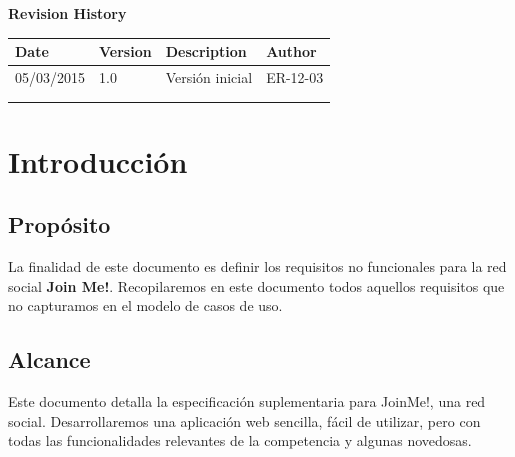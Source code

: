\documentclass[12pt, a4paper, titlepage]{article}
\begin{document}
\begin{titlepage}
\vspace{2cm}
\begin{center}
	\large{\textbf{Revision History}}
	
    \begin{tabular}{ | p{4cm} | p{2cm} | p{5cm} | p{4cm} |}
    \hline
    \textbf{Date} & \textbf{Version} & \textbf{Description} & \textbf{Author} \\ \hline
    05/03/2015 & 1.0 & Versión inicial & ER-12-03  \\ \hline
    & & & \\ \hline
    & & & \\ \hline
    \end{tabular}
\end{center}

\end{titlepage}
\clearpage


\tableofcontents
\clearpage

\section{Introducción}

\subsection{Propósito}

La finalidad de este documento es definir los requisitos no funcionales para la red social \textbf{Join Me!}. Recopilaremos en este documento todos aquellos requisitos que no capturamos en el modelo de casos de uso.

\subsection{Alcance}

Este documento detalla la especificación suplementaria para JoinMe!, una red social. Desarrollaremos una aplicación web sencilla, fácil de utilizar, pero con todas las funcionalidades relevantes de la competencia y algunas novedosas.
\end{document}

